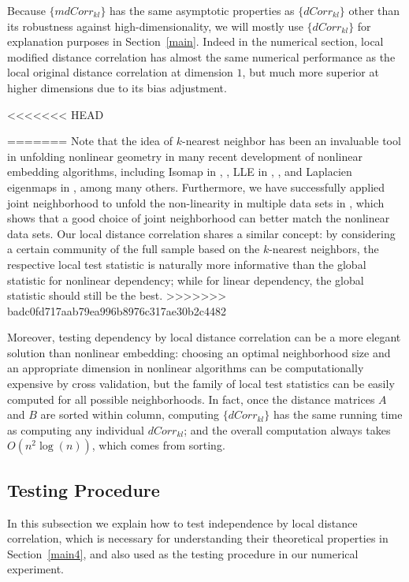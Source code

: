 \documentclass[11pt]{article}
\begin{document}
Because $\{mdCorr_{kl}\}$ has the same asymptotic properties as $\{dCorr_{kl}\}$ other than its robustness against high-dimensionality, we will mostly use $\{dCorr_{kl}\}$ for explanation purposes in Section~\ref{main}. Indeed in the numerical section, local modified distance correlation has almost the same numerical performance as the local original distance correlation at dimension $1$, but much more superior at higher dimensions due to its bias adjustment.

<<<<<<< HEAD

=======
Note that the idea of $k$-nearest neighbor has been an invaluable tool in unfolding nonlinear geometry in many recent development of nonlinear embedding algorithms, including Isomap in \cite{TenenbaumSilvaLangford2000}, \cite{SilvaTenenbaum2003}, LLE in \cite{SaulRoweis2000}, \cite{RoweisSaul2003}, and Laplacien eigenmaps in \cite{BelkinNiyogi2003}, among many others. Furthermore, we have successfully applied joint neighborhood to unfold the non-linearity in multiple data sets in \cite{ShenVogelsteinPriebe2015}, which shows that a good choice of joint neighborhood can better match the nonlinear data sets. Our local distance correlation shares a similar concept: by considering a certain community of the full sample based on the $k$-nearest neighbors, the respective local test statistic is naturally more informative than the global statistic for nonlinear dependency; while for linear dependency, the global statistic should still be the best.
>>>>>>> badc0fd717aab79ea996b8976c317ae30b2c4482

Moreover, testing dependency by local distance correlation can be a more elegant solution than nonlinear embedding: choosing an optimal neighborhood size and an appropriate dimension in nonlinear algorithms can be computationally expensive by cross validation, but the family of local test statistics can be easily computed for all possible neighborhoods. In fact, once the distance matrices $A$ and $B$ are sorted within column, computing $\{dCorr_{kl}\}$ has the same running time as computing any individual $dCorr_{kl}$; and the overall computation always takes $O(n^2 \log(n))$, which comes from sorting. 

\subsection{Testing Procedure}
\label{main3}
In this subsection we explain how to test independence by local distance correlation, which is necessary for understanding their theoretical properties in Section~\ref{main4}, and also used as the testing procedure in our numerical experiment.
\end{document}
